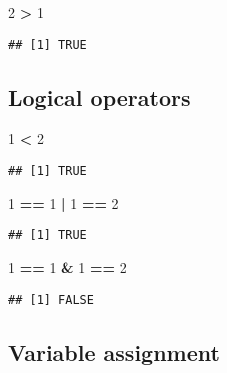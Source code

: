\documentclass[]{article}
\newenvironment{Shaded}{\begin{snugshade}}{\end{snugshade}}
\newcommand{\DecValTok}[1]{\textcolor[rgb]{0.00,0.00,0.81}{#1}}
\newcommand{\StringTok}[1]{\textcolor[rgb]{0.31,0.60,0.02}{#1}}
\newcommand{\OperatorTok}[1]{\textcolor[rgb]{0.81,0.36,0.00}{\textbf{#1}}}
\begin{document}
\begin{Shaded}
\begin{Highlighting}[]
\DecValTok{2} \OperatorTok{>}\StringTok{ }\DecValTok{1}
\end{Highlighting}
\end{Shaded}

\begin{verbatim}
## [1] TRUE
\end{verbatim}

\subsection{Logical operators}\label{logical-operators-1}

\begin{Shaded}
\begin{Highlighting}[]
\DecValTok{1} \OperatorTok{<}\StringTok{ }\DecValTok{2}
\end{Highlighting}
\end{Shaded}

\begin{verbatim}
## [1] TRUE
\end{verbatim}

\begin{Shaded}
\begin{Highlighting}[]
\DecValTok{1} \OperatorTok{==}\StringTok{ }\DecValTok{1} \OperatorTok{|}\StringTok{ }\DecValTok{1} \OperatorTok{==}\StringTok{ }\DecValTok{2}
\end{Highlighting}
\end{Shaded}

\begin{verbatim}
## [1] TRUE
\end{verbatim}

\begin{Shaded}
\begin{Highlighting}[]
\DecValTok{1} \OperatorTok{==}\StringTok{ }\DecValTok{1} \OperatorTok{&}\StringTok{ }\DecValTok{1} \OperatorTok{==}\StringTok{ }\DecValTok{2}
\end{Highlighting}
\end{Shaded}

\begin{verbatim}
## [1] FALSE
\end{verbatim}

\subsection{Variable assignment}\label{variable-assignment}
\end{document}
